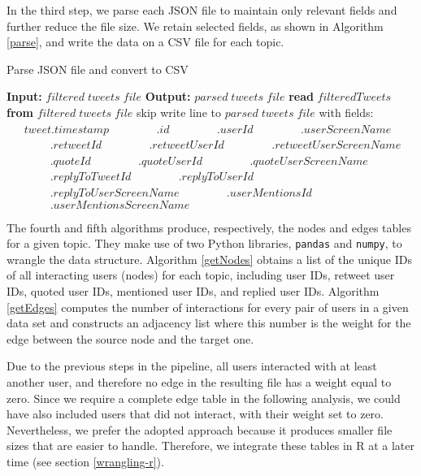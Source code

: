 In the third step, we parse each JSON file to maintain only relevant fields and further reduce the file size. We retain selected fields, as shown in Algorithm \vref{parse}, and write the data on a CSV file for each topic.
\begin{algorithm}
  \caption{Parse JSON file and convert to CSV}\label{parse}
  \begin{algorithmic}[1]
  \State \textbf{Input:} $filtered\;tweets\;file$
  \State \textbf{Output:} $parsed\;tweets\;file$
  \State \textbf{read} $filteredTweets$ \textbf{from} $filtered\;tweets\;file$
      \State skip
    \EndIf
    \State write line to $parsed\;tweets\;file$ with fields:
    \Statex $\quad\;\;tweet.timestamp$
    \Statex $\qquad\quad\;\;\;.id$
    \Statex $\qquad\quad\;\;\;.userId$
    \Statex $\qquad\quad\;\;\;.userScreenName$
    \Statex $\qquad\quad\;\;\;.retweetId$
    \Statex $\qquad\quad\;\;\;.retweetUserId$
    \Statex $\qquad\quad\;\;\;.retweetUserScreenName$
    \Statex $\qquad\quad\;\;\;.quoteId$
    \Statex $\qquad\quad\;\;\;.quoteUserId$
    \Statex $\qquad\quad\;\;\;.quoteUserScreenName$
    \Statex $\qquad\quad\;\;\;.replyToTweetId$
    \Statex $\qquad\quad\;\;\;.replyToUserId$
    \Statex $\qquad\quad\;\;\;.replyToUserScreenName$
    \Statex $\qquad\quad\;\;\;.userMentionsId$
    \Statex $\qquad\quad\;\;\;.userMentionsScreenName$
  \EndFor
  \end{algorithmic}
\end{algorithm}

The fourth and fifth algorithms produce, respectively, the nodes and edges tables for a given topic. They make use of two Python libraries, \texttt{pandas} and \texttt{numpy}, to wrangle the data structure. Algorithm \vref{getNodes} obtains a list of the unique IDs of all interacting users (nodes) for each topic, including user IDs, retweet user IDs, quoted user IDs, mentioned user IDs, and replied user IDs. Algorithm \vref{getEdges} computes the number of interactions for every pair of users in a given data set and constructs an adjacency list where this number is the weight for the edge between the source node and the target one.

Due to the previous steps in the pipeline, all users interacted with at least another user, and therefore no edge in the resulting file has a weight equal to zero. Since we require a complete edge table in the following analysis, we could have also included users that did not interact, with their weight set to zero. Nevertheless, we prefer the adopted approach because it produces smaller file sizes that are easier to handle. Therefore, we integrate these tables in R at a later time (see section \vref{wrangling-r}).

